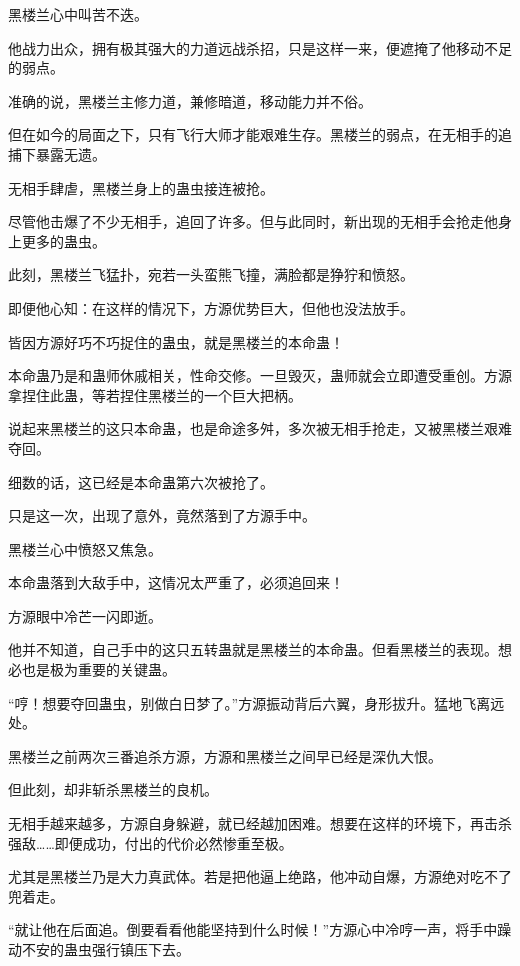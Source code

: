 
\begin{this_body}



黑楼兰心中叫苦不迭。

他战力出众，拥有极其强大的力道远战杀招，只是这样一来，便遮掩了他移动不足的弱点。

准确的说，黑楼兰主修力道，兼修暗道，移动能力并不俗。

但在如今的局面之下，只有飞行大师才能艰难生存。黑楼兰的弱点，在无相手的追捕下暴露无遗。

无相手肆虐，黑楼兰身上的蛊虫接连被抢。

尽管他击爆了不少无相手，追回了许多。但与此同时，新出现的无相手会抢走他身上更多的蛊虫。

此刻，黑楼兰飞猛扑，宛若一头蛮熊飞撞，满脸都是狰狞和愤怒。

即便他心知：在这样的情况下，方源优势巨大，但他也没法放手。

皆因方源好巧不巧捉住的蛊虫，就是黑楼兰的本命蛊！

本命蛊乃是和蛊师休戚相关，性命交修。一旦毁灭，蛊师就会立即遭受重创。方源拿捏住此蛊，等若捏住黑楼兰的一个巨大把柄。

说起来黑楼兰的这只本命蛊，也是命途多舛，多次被无相手抢走，又被黑楼兰艰难夺回。

细数的话，这已经是本命蛊第六次被抢了。

只是这一次，出现了意外，竟然落到了方源手中。

黑楼兰心中愤怒又焦急。

本命蛊落到大敌手中，这情况太严重了，必须追回来！

方源眼中冷芒一闪即逝。

他并不知道，自己手中的这只五转蛊就是黑楼兰的本命蛊。但看黑楼兰的表现。想必也是极为重要的关键蛊。

“哼！想要夺回蛊虫，别做白日梦了。”方源振动背后六翼，身形拔升。猛地飞离远处。

黑楼兰之前两次三番追杀方源，方源和黑楼兰之间早已经是深仇大恨。

但此刻，却非斩杀黑楼兰的良机。

无相手越来越多，方源自身躲避，就已经越加困难。想要在这样的环境下，再击杀强敌……即便成功，付出的代价必然惨重至极。

尤其是黑楼兰乃是大力真武体。若是把他逼上绝路，他冲动自爆，方源绝对吃不了兜着走。

“就让他在后面追。倒要看看他能坚持到什么时候！”方源心中冷哼一声，将手中躁动不安的蛊虫强行镇压下去。


\end{this_body}
